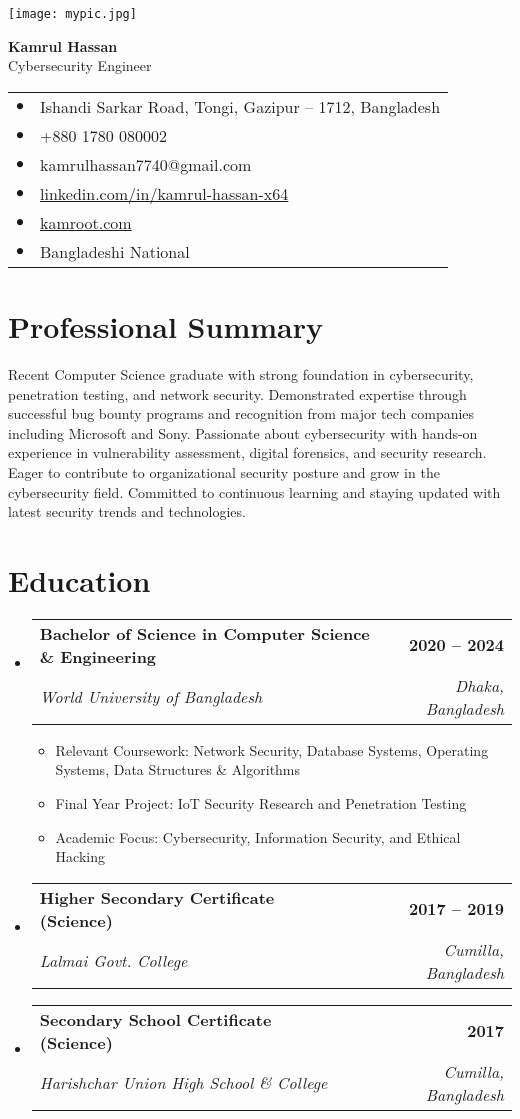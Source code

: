 \documentclass[11pt,a4paper]{article}
\makeatletter
\newcommand{\resumeitem}[1]{\item\small{#1}}
\newcommand{\resumesubheading}[4]{
  \vspace{-1pt}\item
    \begin{tabular*}{0.97\textwidth}[t]{l@{\extracolsep{\fill}}r}
      \textbf{#1} & \textbf{\small #2} \\
      \textit{\small#3} & \textit{\small #4} \\
    \end{tabular*}\vspace{-5pt}
}
\newcommand{\resumesubheadingliststart}{\begin{itemize}[leftmargin=0.15in, label={}]}
\newcommand{\resumesubheadinglistend}{\end{itemize}}
\newcommand{\resumeitemliststart}{\begin{itemize}}
\newcommand{\resumeitemlistend}{\end{itemize}\vspace{-5pt}}
\newcommand{\header}[6]{
  \begin{center}
    \begin{minipage}{0.3\textwidth}
      \texttt{[image: mypic.jpg]}
    \end{minipage}
    \hfill
    \begin{minipage}{0.65\textwidth}
      {\Huge\bfseries\color{primaryblue} #1}\\[0.5em]
      {\Large\color{secondaryblue} #2}\\[0.3em]
      \begin{tabular}{ll}
        \textcolor{primaryblue}{$\bullet$} & #3 \\
        \textcolor{primaryblue}{$\bullet$} & #4 \\
        \textcolor{primaryblue}{$\bullet$} & #5 \\
        \textcolor{primaryblue}{$\bullet$} & \href{https://linkedin.com/in/kamrul-hassan-x64}{#6} \\
        \textcolor{primaryblue}{$\bullet$} & \href{https://kamroot.com}{kamroot.com} \\
        \textcolor{primaryblue}{$\bullet$} & Bangladeshi National
      \end{tabular}
    \end{minipage}
  \end{center}
  \vspace{-10pt}
}
\makeatother
\begin{document}
\header{Kamrul Hassan}{Cybersecurity Engineer}{Ishandi Sarkar Road, Tongi, Gazipur – 1712, Bangladesh}{+880 1780 080002}{kamrulhassan7740@gmail.com}{linkedin.com/in/kamrul-hassan-x64}

\section{Professional Summary}
\small{
Recent Computer Science graduate with strong foundation in cybersecurity, penetration testing, and network security. Demonstrated expertise through successful bug bounty programs and recognition from major tech companies including Microsoft and Sony. Passionate about cybersecurity with hands-on experience in vulnerability assessment, digital forensics, and security research. Eager to contribute to organizational security posture and grow in the cybersecurity field. Committed to continuous learning and staying updated with latest security trends and technologies.
}

\section{Education}
\resumesubheadingliststart
\resumesubheading
{Bachelor of Science in Computer Science \& Engineering}{2020 -- 2024}
{World University of Bangladesh}{Dhaka, Bangladesh}
\resumeitemliststart
\resumeitem{Relevant Coursework: Network Security, Database Systems, Operating Systems, Data Structures \& Algorithms}
\resumeitem{Final Year Project: IoT Security Research and Penetration Testing}
\resumeitem{Academic Focus: Cybersecurity, Information Security, and Ethical Hacking}
\resumeitemlistend

\resumesubheading
{Higher Secondary Certificate (Science)}{2017 -- 2019}
{Lalmai Govt. College}{Cumilla, Bangladesh}
\resumeitemliststart
\resumeitemlistend

\resumesubheading
{Secondary School Certificate (Science)}{2017}
{Harishchar Union High School \& College}{Cumilla, Bangladesh}
\resumeitemliststart
\resumeitemlistend
\resumesubheadinglistend

\end{document}
